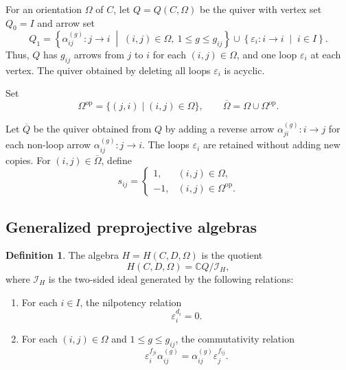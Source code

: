 \documentclass[12pt,reqno]{amsart}
\numberwithin{equation}{section}
\theoremstyle{definition}
\newtheorem{definition}[theorem]{Definition}
\theoremstyle{remark}
\theoremstyle{plain}
\theoremstyle{plain}
\begin{document}
     For an orientation $\Omega$ of $C$, let $Q=Q(C,\Omega)$ be the quiver with vertex set $Q_0=I$ and arrow set
     \[
         Q_1= 
    \left\{
    \alpha_{ij}^{(g)}:j\to i \;\middle|\; (i,j)\in\Omega,\ 1\leq g\leq g_{ij} \right\}
    \cup 
    \left\{
    \varepsilon_i:i\to i \;\middle|\; i\in I \right\}.
     \]
     Thus, $Q$ has $g_{ij}$ arrows from $j$ to $i$ for each $(i,j)\in\Omega$, and one loop $\varepsilon_i$ at each vertex. The quiver obtained by deleting all loops $\varepsilon_i$ is acyclic.

     Set
     \[
         \Omega^{\mathrm{op}} =\{(j,i)\mid(i,j)\in\Omega\}, \qquad \overline{\Omega}=\Omega\cup\Omega^{\mathrm{op}}.
     \]

    Let $\overline{Q}$ be the quiver obtained from $Q$ by adding a reverse arrow $\alpha_{ji}^{(g)}:i\to j$ for each non-loop arrow $\alpha_{ij}^{(g)}:j\to i$. The loops $\varepsilon_i$ are retained without adding new copies. For $(i,j)\in\overline{\Omega}$, define
    \[
    s_{ij}= \begin{cases}
    1, & (i,j)\in\Omega,\\
    -1, & (i,j)\in\Omega^{\mathrm{op}}.
    \end{cases}
    \]

\subsection{Generalized preprojective algebras}

    \begin{definition}\label{def:H}
    The algebra $H=H(C,D,\Omega)$ is the quotient
    \[
    H(C,D,\Omega)=\mathbb{C}Q/\mathcal{I}_H,
    \]
    where $\mathcal{I}_H$ is the two-sided ideal generated by the following relations:
    \begin{enumerate}
    \item For each $i\in I$, the nilpotency relation
    \[
    \varepsilon_i^{d_i}=0.
    \]
    \item For each $(i,j)\in\Omega$ and
    $1\leq g\leq g_{ij}$, the commutativity relation
    \[
    \varepsilon_i^{f_{ji}}\alpha_{ij}^{(g)}
    =
    \alpha_{ij}^{(g)}\varepsilon_j^{f_{ij}}.
    \]
    \end{enumerate}
    \end{definition}

\end{document}
